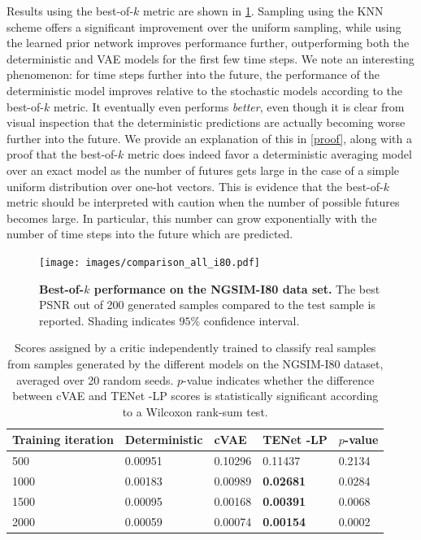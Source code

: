 \documentclass{article}
\newcommand{\modelname}{TENet }
\begin{document}
Results using the best-of-$k$ metric are shown in \cref{best-of-k-i80}.
Sampling using the KNN scheme offers a significant improvement over the uniform sampling, while using the learned prior network improves performance further, outperforming both the deterministic and VAE models for the first few time steps.
We note an interesting phenomenon: for time steps further into the future, the performance of the deterministic model improves relative to the stochastic models according to the best-of-$k$ metric.
It eventually even performs \emph{better}, even though it is clear from visual inspection that the deterministic predictions are actually becoming worse further into the future.
We provide an explanation of this in \cref{proof}, along with a proof that the best-of-$k$ metric does indeed favor a deterministic averaging model over an exact model as the number of futures gets large in the case of a simple uniform distribution over one-hot vectors.
This is evidence that the best-of-$k$ metric should be interpreted with caution when the number of possible futures becomes large.
In particular, this number can grow exponentially with the number of time steps into the future which are predicted.


\begin{figure}[t!]
  \centering
  \texttt{[image: images/comparison\_all\_i80.pdf]}
  \caption{
    \textbf{Best-of-$k$ performance on the NGSIM-I80 data set.}
    The best PSNR out of 200 generated samples compared to the test sample is reported.
    Shading indicates $95\%$ confidence interval.
  }
  \label{best-of-k-i80}
\end{figure}

\begin{table}[t!]
  \caption{
    Scores assigned by a critic independently trained to classify real samples from samples generated by the different models on the NGSIM-I80 dataset, averaged over 20 random seeds.
$p$-value indicates whether the difference between cVAE and \modelname-LP scores is statistically significant according to a Wilcoxon rank-sum test.
  }
  \label{critic-table}
  \centering
  \begin{tabular}{l|l|lll}
    \toprule
    Training iteration     & Deterministic & cVAE & \modelname-LP & $p$-value \\
    \midrule
    500 & 0.00951 & 0.10296 & 0.11437 & 0.2134 \\
    1000 & 0.00183 & 0.00989 & \textbf{0.02681} & 0.0284 \\
    1500 & 0.00095 & 0.00168 & \textbf{0.00391} & 0.0068 \\
    2000 & 0.00059 & 0.00074 & \textbf{0.00154} & 0.0002 \\
    \bottomrule
  \end{tabular}
\end{table}
\end{document}
